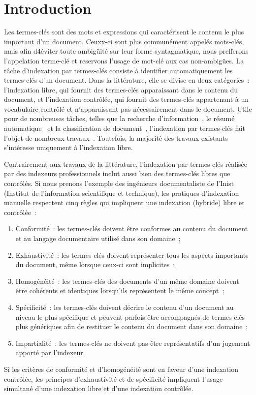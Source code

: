 \section{Introduction}
\label{sec:main:domain_specific_keyphrase_annotation-introduction}
  Les termes-clés sont des mots et expressions qui caractérisent le contenu le
  plus important d'un document. Ceuxx-ci sont plus communément appelés
  mots-clés, mais afin d4éviter toute ambigüité sur leur forme  syntagmatique,
  nous prefferons l'appelation \og{}terme-clé\fg{} et reservons l'usage de
  \og{}mot-clé\fg{} aux cas non-ambigües. La tâche d'indexation par termes-clés consiste à
  identifier automatiquement les termes-clés d'un document. Dans la littérature,
  elle se divise en deux catégories~: l'indexation libre, qui fournit des
  termes-clés apparaissant dans le contenu du document, et l'indexation
  contrôlée, qui fournit des termes-clés appartenant à un vocabulaire contrôlé
  et n'apparaissant pas nécessairement dans le document. Utile pour de
  nombreuses tâches, telles que la recherche
  d'information~\cite{jones1999phrasier}, le résumé
  automatique~\cite{avanzo2005keyphrase} et la classification de
  document~\cite{han2007webdocumentclustering}, l'indexation par termes-clés
  fait l'objet de nombreux travaux~\cite{hasan2014state_of_the_art}. Toutefois,
  la majorité des travaux existants s'intéresse uniquement à l'indexation libre.
  
  Contrairement aux travaux de la littérature, l'indexation par termes-clés
  réalisée par des indexeurs professionnels inclut aussi bien des termes-clés
  libres que contrôlés. Si nous prenons l'exemple des ingénieurs documentaliste
  de l'Inist (Institut de l'information scientifique et technique), les
  pratiques d'indexation manuelle respectent cinq règles qui impliquent une
  indexation (hybride) libre et contrôlée~:
  \begin{enumerate}
    \item{Conformité~: les termes-clés doivent être conformes au contenu du
          document et au langage documentaire utilisé dans son domaine~;}
    \item{Exhaustivité~: les termes-clés doivent représenter tous les
          aspects importants du document, même lorsque ceux-ci sont
          implicites~;}
    \item{Homogénéité~: les termes-clés des documents d'un même domaine
          doivent être cohérents et identiques lorsqu'ils représentent le
          même concept~;}
    \item{Spécificité~: les termes-clés doivent décrire le contenu d'un
          document au niveau le plus spécifique et peuvent parfois être
          accompagnés de termes-clés plus génériques afin de restituer le
          contenu du document dans son domaine~;}
    \item{Impartialité~: les termes-clés ne doivent pas être représentatifs
          d'un jugement apporté par l'indexeur.}
  \end{enumerate}
  Si les critères de conformité et d'homogénéité sont en faveur d'une indexation
  contrôlée, les principes d'exhaustivité et de spécificité impliquent l'usage
  simultané d'une indexation libre et d'une indexation contrôlée.


